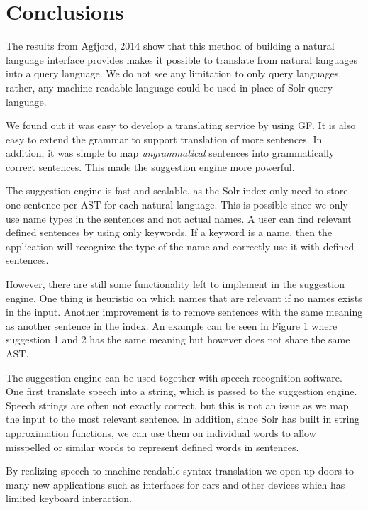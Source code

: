 \documentclass[10pt, a4paper]{article}
\begin{document}
\section{Conclusions}
The results from Agfjord, 2014 show that this method of building a natural language interface provides makes it possible to translate from natural languages into a query language. We do not see any limitation to only query languages, rather, any machine readable language could be used in place of Solr query language.

We found out it was easy to develop a translating service by using GF. It is also easy to extend the grammar to support translation of more sentences. In addition, it was simple to map \emph{ungrammatical} sentences into grammatically correct sentences. This made the suggestion engine more powerful.

The suggestion engine is fast and scalable, as the Solr index only need to store one sentence per AST for each natural language. This is possible since we only use name types in the sentences and not actual names. A user can find relevant defined sentences by using only keywords. If a keyword is a name, then the application will recognize the type of the name and correctly use it with defined sentences.

However, there are still some functionality left to implement in the suggestion engine. One thing is heuristic on which names that are relevant if no names exists in the input. Another improvement is to remove sentences with the same meaning as another sentence in the index. An example can be seen in Figure 1 where suggestion 1 and 2 has the same meaning but however does not share the same AST.

The suggestion engine can be used together with speech recognition software. One first translate speech into a string, which is passed to the suggestion engine. Speech strings are often not exactly correct, but this is not an issue as we map the input to the most relevant sentence. In addition, since Solr has built in string approximation functions, we can use them on individual words to allow misspelled or similar words to represent defined words in sentences.

By realizing speech to machine readable syntax translation we open up doors to many new applications such as interfaces for cars and other devices which has limited keyboard interaction.


% 

\end{document}
